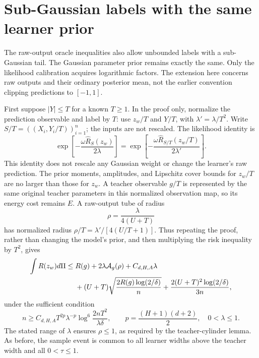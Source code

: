 \section{Sub-Gaussian labels with the same learner prior}
\label{sec:subgaussian-labels}

The raw-output oracle inequalities also allow unbounded labels with a
sub-Gaussian tail. The Gaussian parameter prior remains exactly the
same. Only the likelihood calibration acquires logarithmic factors.
The extension here concerns raw outputs and their ordinary posterior
mean, not the earlier convention clipping predictions to $[-1,1]$.

First suppose $|Y|\leq T$ for a known $T\geq1$. In the proof only,
normalize the prediction observable and label by $T$: use $z_w/T$
and $Y/T$, with $\lambda'=\lambda/T^2$. Write
$S/T=((X_i,Y_i/T))_{i=1}^n$; the inputs are not rescaled.
The likelihood identity is
\[
 \exp\left[-\frac{\omega\widehat R_S(z_w)}{2\lambda}\right]
 =\exp\left[-\frac{\omega\widehat R_{S/T}(z_w/T)}{2\lambda'}\right].
\]
This identity does not rescale any Gaussian weight or change the
learner's raw prediction. The prior moments, amplitudes, and Lipschitz
cover bounds for $z_w/T$ are no larger than those for $z_w$.
A teacher observable $g/T$ is represented by the same original teacher
parameters in this normalized observation map, so its energy cost
remains $E$. A raw-output tube of radius
\[
 \rho=\frac\lambda{4(U+T)}
\]
has normalized radius
$\rho/T=\lambda'/[4(U/T+1)]$.
Thus repeating the proof, rather than changing the model's prior,
and then multiplying the risk inequality by $T^2$, gives
\begin{align}
 \int R(z_w)d\Pi
 \leq\;&R(g)+2\lambda\mathcal A_g(\rho)+C_{d,H,A}\lambda\notag\\
 &+(U+T)\sqrt{\frac{2R(g)\log(2/\delta)}n}
       +\frac{2(U+T)^2\log(2/\delta)}{3n},
 \label{eq:bounded-large-label-oracle}
\end{align}
under the sufficient condition
\begin{equation}
 n\geq C_{d,H,A}T^{2p}\lambda^{-p}
           \log^6\!\frac{2nT^2}{\lambda\delta},
 \qquad p=\frac{(H+1)(d+2)}2,
 \quad 0<\lambda\leq1.
 \label{eq:bounded-large-label-budget}
\end{equation}
The stated range of $\lambda$ ensures $\rho\leq1$, as required by
the teacher-cylinder lemma. As before, the sample event is common to
all learner widths above the teacher width and all $0<\tau\leq1$.

